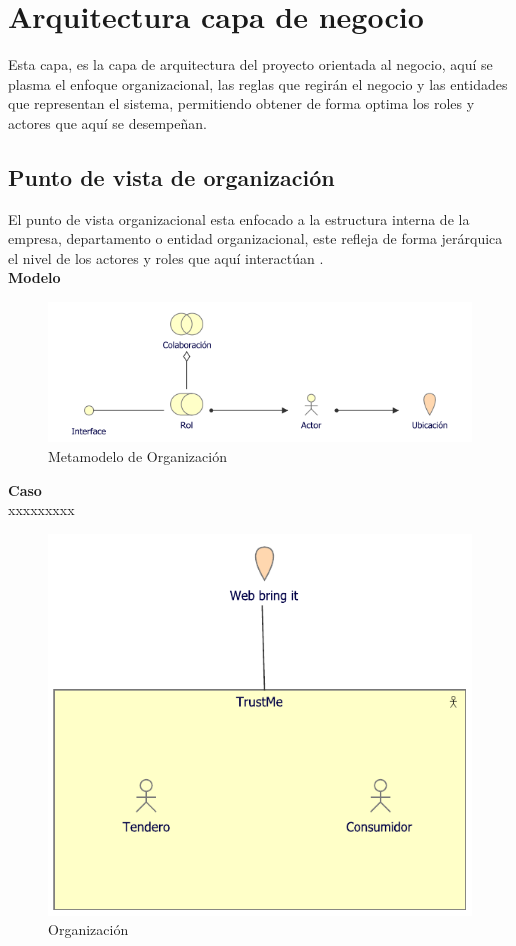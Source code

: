 \section{Arquitectura capa de negocio}
{Esta capa, es la capa de arquitectura del proyecto orientada al negocio, aquí se plasma el enfoque organizacional, las reglas que regirán el negocio y las entidades que representan el sistema, permitiendo obtener de forma optima los roles y actores que aquí se desempeñan.}

	\subsection{Punto de vista de organización}
	{ El punto de vista organizacional esta enfocado a la estructura interna de la empresa, departamento o entidad organizacional, este refleja de forma jerárquica el nivel de los actores y roles que aquí interactúan \cite{archimate}.\\
		
		\textbf{Modelo}\\
		\begin{figure}[H]
			\centering
			\includegraphics[width=0.8\linewidth]{development/organizacion.png}
			\caption{Metamodelo de Organización}
		\end{figure}
	
		\textbf{Caso}\\
		xxxxxxxxx\\
		
		\begin{figure}[H]
			\centering
			\includegraphics[width=0.8\linewidth]{development/negocio.pdf}
			\caption{Organización}
		\end{figure}
	}
	
